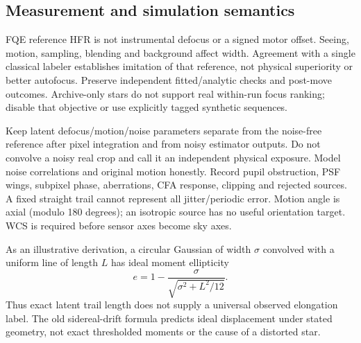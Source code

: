 \documentclass[11pt,a4paper]{article}
\begin{document}
\subsection{Measurement and simulation semantics}
FQE reference HFR is not instrumental defocus or a signed motor offset.
Seeing, motion, sampling, blending and background affect width. Agreement with
a single classical labeler establishes imitation of that reference, not
physical superiority or better autofocus. Preserve independent fitted/analytic
checks and post-move outcomes. Archive-only stars do not support real
within-run focus ranking; disable that objective or use explicitly tagged
synthetic sequences.

Keep latent defocus/motion/noise parameters separate from the noise-free
reference after pixel integration and from noisy estimator outputs. Do not
convolve a noisy real crop and call it an independent physical exposure. Model
noise correlations and original motion honestly. Record pupil obstruction,
PSF wings, subpixel phase, aberrations, CFA response, clipping and rejected
sources. A fixed straight trail cannot represent all jitter/periodic error.
Motion angle is axial (modulo 180 degrees); an isotropic source has no useful
orientation target. WCS is required before sensor axes become sky axes.

As an illustrative derivation, a circular Gaussian of width $\sigma$ convolved
with a uniform line of length $L$ has ideal moment ellipticity
\[
 e=1-\frac{\sigma}{\sqrt{\sigma^2+L^2/12}}.
\]
Thus exact latent trail length does not supply a universal observed elongation
label. The old sidereal-drift formula predicts ideal displacement under stated
geometry, not exact thresholded moments or the cause of a distorted star.
\end{document}
